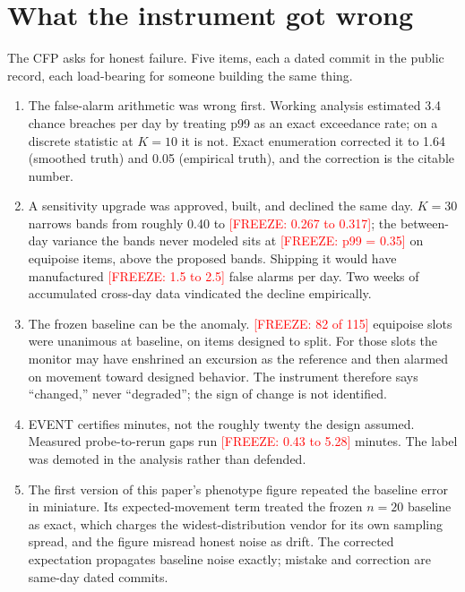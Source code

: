\documentclass[conference]{IEEEtran}
\newcommand{\freeze}[1]{\textcolor{red}{[FREEZE: #1]}}
\begin{document}
\section{What the instrument got wrong}

The CFP asks for honest failure. Five items, each a dated commit in
the public record, each load-bearing for someone building the same
thing.

\begin{enumerate}
\renewcommand{\theenumi}{\alph{enumi}}
\renewcommand{\labelenumi}{(\theenumi)}
\item The false-alarm arithmetic was wrong first. Working analysis
  estimated 3.4 chance breaches per day by treating p99 as an exact
  exceedance rate; on a discrete statistic at $K=10$ it is not.
  Exact enumeration corrected it to 1.64 (smoothed truth) and 0.05
  (empirical truth), and the correction is the citable number.
\item A sensitivity upgrade was approved, built, and declined the
  same day. $K=30$ narrows bands from roughly 0.40 to \freeze{0.267
  to 0.317}; the between-day variance the bands never modeled sits
  at \freeze{p99 = 0.35} on equipoise items, above the proposed
  bands. Shipping it would have manufactured \freeze{1.5 to 2.5}
  false alarms per day. Two weeks of accumulated cross-day data
  vindicated the decline empirically.
\item The frozen baseline can be the anomaly. \freeze{82 of 115}
  equipoise slots were unanimous at baseline, on items designed to
  split. For those slots the monitor may have enshrined an
  excursion as the reference and then alarmed on movement toward
  designed behavior. The instrument therefore says ``changed,''
  never ``degraded''; the sign of change is not identified.
\item EVENT certifies minutes, not the roughly twenty the design
  assumed. Measured probe-to-rerun gaps run \freeze{0.43 to 5.28}
  minutes. The label was demoted in the analysis rather than
  defended.
\item The first version of this paper's phenotype figure repeated
  the baseline error in miniature. Its expected-movement term
  treated the frozen $n=20$ baseline as exact, which charges the
  widest-distribution vendor for its own sampling spread, and the
  figure misread honest noise as drift. The corrected expectation
  propagates baseline noise exactly; mistake and correction are
  same-day dated commits.
\end{enumerate}
\end{document}

